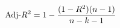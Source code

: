 \documentclass[preview]{standalone}
\begin{document}
\begin{align*}
\special{dvisvgm:raw <g id='unique000'>}\text{Adj-}R^2 = 1 - \frac{(1-R^2)(n-1)}{n-k-1}\special{dvisvgm:raw </g>}
\end{align*}
\end{document}
